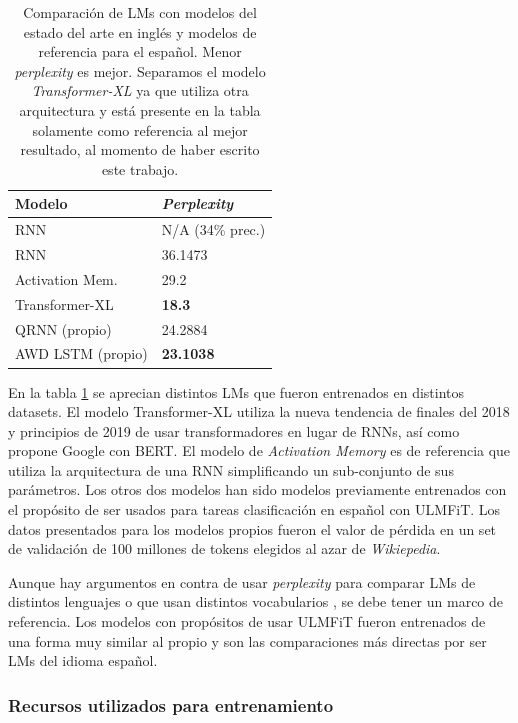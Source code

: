 \begin{table}
\centering
\begin{tabular}{|l|l|}
\hline
\textbf{Modelo} & \textbf{\textit{Perplexity}} \\
\hline
RNN \parencite{goldszmidt2018} & N/A (34\% prec.) \\
RNN \parencite{ingham2018} & 36.1473 \\
Activation Mem. \parencite{rae2018} & 29.2 \\
\hline
Transformer-XL \parencite{dai2019} & \textbf{18.3} \\
\hline
QRNN (propio) & 24.2884 \\
AWD LSTM (propio) & \textbf{23.1038} \\



\hline

\end{tabular}
\caption{Comparación de LMs con modelos del estado del arte en inglés y modelos de referencia para el español. Menor \textit{perplexity} es mejor. Separamos el modelo \textit{Transformer-XL} ya que utiliza otra arquitectura y está presente en la tabla solamente como referencia al mejor resultado, al momento de haber escrito este trabajo.}
\label{tab:lmcomp}
\end{table}

En la tabla \ref{tab:lmcomp} se aprecian distintos LMs que fueron entrenados en distintos datasets. El modelo Transformer-XL \parencite{dai2019} utiliza la nueva tendencia de finales del 2018 y principios de 2019 de usar transformadores en lugar de RNNs, así como propone Google con BERT. El modelo de \textit{Activation Memory} \parencite{rae2018} es de referencia que utiliza la arquitectura de una RNN simplificando un sub-conjunto de sus parámetros. Los otros dos modelos han sido modelos previamente entrenados con el propósito de ser usados para tareas clasificación en español con ULMFiT. Los datos presentados para los modelos propios fueron el valor de pérdida en un set de validación de 100 millones de tokens elegidos al azar de \textit{Wikiepedia}.

Aunque hay argumentos en contra de usar \textit{perplexity} para comparar LMs de distintos lenguajes o que usan distintos vocabularios \parencite{chen1998evaluation}, se debe tener un marco de referencia. Los modelos con propósitos de usar ULMFiT fueron entrenados de una forma muy similar al propio y son las comparaciones más directas por ser LMs del idioma español.


\subsubsection{Recursos utilizados para entrenamiento}

